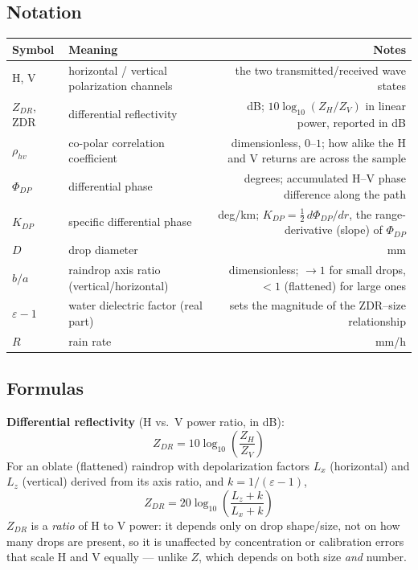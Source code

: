 \documentclass[11pt]{article}
\begin{document}
\subsection{Notation}
\begin{longtable}{L M N}
\toprule
Symbol & Meaning & Notes \\
\midrule
\endhead
H, V & horizontal / vertical polarization channels & the two transmitted/received wave states \\
$Z_{DR}$, ZDR & differential reflectivity & dB; $10\log_{10}(Z_H/Z_V)$ in linear power, reported in dB \\
$\rho_{hv}$ & co-polar correlation coefficient & dimensionless, $0$--$1$; how alike the H and V returns are across the sample \\
$\Phi_{DP}$ & differential phase & degrees; accumulated H--V phase difference along the path \\
$K_{DP}$ & specific differential phase & deg/km; $K_{DP} = \tfrac12\,d\Phi_{DP}/dr$, the range-derivative (slope) of $\Phi_{DP}$ \\
$D$ & drop diameter & mm \\
$b/a$ & raindrop axis ratio (vertical/horizontal) & dimensionless; $\to 1$ for small drops, $<1$ (flattened) for large ones \\
$\varepsilon-1$ & water dielectric factor (real part) & sets the magnitude of the ZDR--size relationship \\
$R$ & rain rate & mm/h \\
\bottomrule
\end{longtable}

\subsection{Formulas}

\textbf{Differential reflectivity} (H vs.\ V power ratio, in dB):
\begin{equation}
Z_{DR} = 10\log_{10}\!\left(\frac{Z_H}{Z_V}\right)
\end{equation}
For an oblate (flattened) raindrop with depolarization factors $L_x$ (horizontal) and $L_z$ (vertical) derived from its axis ratio, and $k=1/(\varepsilon-1)$,
\begin{equation}
Z_{DR} = 20\log_{10}\!\left(\frac{L_z+k}{L_x+k}\right)
\end{equation}
$Z_{DR}$ is a \emph{ratio} of H to V power: it depends only on drop shape/size, not on how many drops are present, so it is unaffected by concentration or calibration errors that scale H and V equally --- unlike $Z$, which depends on both size \emph{and} number.
\end{document}
